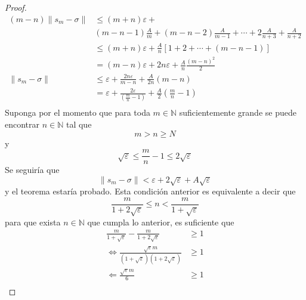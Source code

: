 \documentclass[12pt]{report}
\theoremstyle{largebreak}
\newcommand\norm[1]{\ensuremath{\|#1\|}}
\begin{document}
\begin{proof}
\begin{equation*}
            \begin{split}
                (m-n)\norm{s_m-\sigma}&\leq (m+n)\varepsilon+\\
                &(m-n-1)\frac{A}{m}+(m-n-2)\frac{A}{m-1}+\cdots+2\frac{A}{n+3}+\frac{A}{n+2}\\
                &\leq (m+n)\varepsilon+\frac{A}{n}\left[1+2+\cdots+(m-n-1) \right]\\
                &=(m-n)\varepsilon+2n\varepsilon+\frac{A}{n}\frac{(m-n)^2}{2}\\
                \norm{s_m-\sigma}&\leq\varepsilon+\frac{2n\varepsilon}{m-n}+\frac{A}{2n}(m-n)\\
                &=\varepsilon+\frac{2\varepsilon}{\left(\frac{m}{n}-1\right)}+\frac{A}{2}\left(\frac{m}{n}-1\right)\\
            \end{split}
        \end{equation*}
        Suponga por el momento que para toda $m\in\mathbb{N}$ suficientemente grande se puede encontrar $n\in\mathbb{N}$ tal que
        \begin{equation*}
            m>n\geq N
        \end{equation*}
        y
        \begin{equation*}
            \sqrt{\varepsilon}\leq\frac{m}{n}-1\leq2\sqrt{\varepsilon}
        \end{equation*}
        Se seguiría que
        \begin{equation*}
            \norm{s_m-\sigma}<\varepsilon+2\sqrt{\varepsilon}+A\sqrt{\varepsilon}
        \end{equation*}
        y el teorema estaría probado. Esta condición anterior es equivalente a decir que
        \begin{equation*}
            \frac{m}{1+2\sqrt{\varepsilon}}\leq n<\frac{m}{1+\sqrt{\varepsilon}}
        \end{equation*}
        para que exista $n\in\mathbb{N}$ que cumpla lo anterior, es suficiente que
        \begin{equation*}
            \begin{split}
                \frac{m}{1+\sqrt{\varepsilon}}-\frac{m}{1+2\sqrt{\varepsilon}}&\geq 1\\
                \iff \frac{\sqrt{\varepsilon}m}{(1+\sqrt{\varepsilon})(1+2\sqrt{\varepsilon})}&\geq 1\\
                \Leftarrow \frac{\sqrt{\varepsilon}m}{6}&\geq 1\\
            \end{split}

\end{equation*}
\end{proof}
\end{document}
